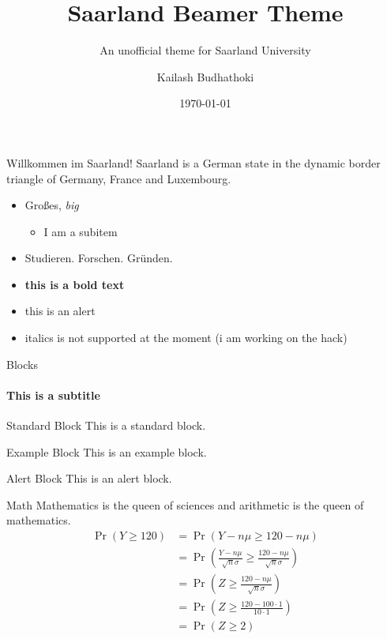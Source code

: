 \documentclass[aspectratio=169]{beamer}
\author{Kailash Budhathoki}
\title{Saarland Beamer Theme}
\subtitle{An unofficial theme for Saarland University}
\institute{Max Planck Institute for Informatics and Saarland University}
\date{\today}
\begin{document}
	\begin{frame}[plain]
		\titlepage
	\end{frame}
	
	\begin{frame}{Willkommen im Saarland!}
	Saarland is a German state in the dynamic border triangle of Germany, France and Luxembourg. 
		\begin{itemize}
			\item Gro{\ss}es, \textit{big}
				\begin{itemize}
					\item I am a subitem
				\end{itemize}
			\item Studieren. Forschen. Gr{\"u}nden.	
			\item \textbf{this is a bold text}
			\item \alert{this is an alert}
			\item italics is not supported at the moment (i am working on the hack)
		\end{itemize}
	\end{frame}

	\begin{frame}{Blocks}
		\framesubtitle{This is a subtitle}
		\begin{block}{Standard Block}
			This is a standard block.
		\end{block}
		
		\begin{exampleblock}{Example Block}
			This is an example block.
		\end{exampleblock}
		
		\begin{alertblock}{Alert Block}
			This is an alert block.
		\end{alertblock}
	\end{frame}
	
	\begin{frame}{Math}
		Mathematics is the queen of sciences and arithmetic is the queen of mathematics.
		\begin{align*}
			\Pr(Y \geq 120) &= \Pr\left(Y-n\mu \geq 120-n\mu \right)\\
			&= \Pr\left( \frac{Y-n\mu }{\sqrt{n}\sigma} \geq \frac{120-n\mu }{\sqrt{n}\sigma} \right)\\
			&=\Pr\left( Z \geq \frac{120-n\mu }{\sqrt{n}\sigma} \right)\\
			&=\Pr\left( Z \geq \frac{120-100 \cdot 1 }{10 \cdot 1} \right)\\
			&=\Pr\left( Z \geq 2\right)
		\end{align*}
	\end{frame}
\end{document}
